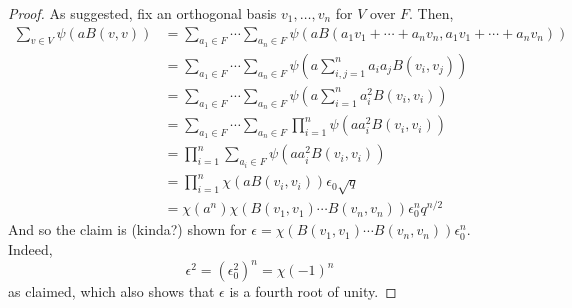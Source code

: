 \begin{proof}
	As suggested, fix an orthogonal basis $v_1,\ldots,v_n$ for $V$ over $F$. Then,
	\begin{align*}
	\sum_{v \in V} \psi(aB(v,v))
		&= \sum_{a_1 \in F} \cdots \sum_{a_n \in F} \psi(aB(a_1v_1+\cdots+a_nv_n,a_1v_1+\cdots+a_nv_n)) \\
		&= \sum_{a_1 \in F} \cdots \sum_{a_n \in F} \psi\left(a\sum_{i,j=1}^n a_ia_jB(v_i,v_j)\right) \\
		&= \sum_{a_1 \in F} \cdots \sum_{a_n \in F} \psi\left(a\sum_{i=1}^n a_i^2B(v_i,v_i)\right) \\
		&= \sum_{a_1 \in F} \cdots \sum_{a_n \in F} \prod_{i=1}^n \psi(aa_i^2B(v_i,v_i)) \\
		&= \prod_{i=1}^n \sum_{a_i \in F} \psi(aa_i^2B(v_i,v_i)) \\
		&= \prod_{i=1}^n \chi(aB(v_i,v_i))\epsilon_0\sqrt{q} \\
		&= \chi(a^n)\chi(B(v_1,v_1) \cdots B(v_n,v_n))\epsilon_0^nq^{n/2}
	\end{align*}
	And so the claim is (kinda?) shown for $\epsilon = \chi(B(v_1,v_1) \cdots B(v_n,v_n))\epsilon_0^n$. Indeed,
	\[ \epsilon^2 = (\epsilon_0^2)^n = \chi(-1)^n \]
	as claimed, which also shows that $\epsilon$ is a fourth root of unity.
\end{proof}
